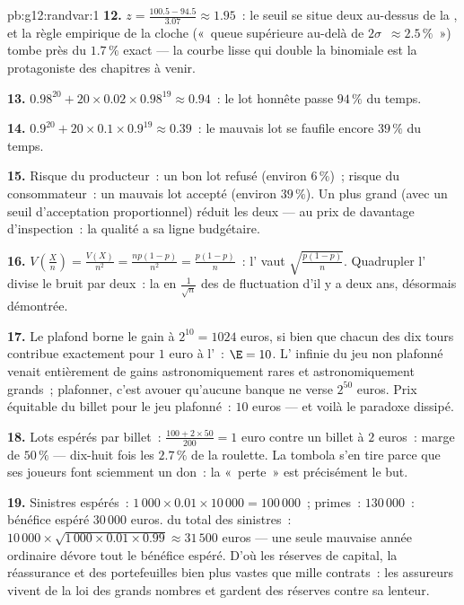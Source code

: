 \begin{solution}{pb:g12:randvar:1}
\textbf{12.} $z = \frac{100.5 - 94.5}{3.07} \approx 1.95$~: le
seuil se situe deux  au-dessus de la , et la
règle empirique de la cloche («~queue supérieure au-delà de
$2\sigma$~$\approx 2.5\,\%$~») tombe près du $1.7\,\%$ exact ---
la courbe lisse qui double la binomiale est la protagoniste des
chapitres à venir.

\textbf{13.} $0.98^{20} + 20 \times 0.02 \times 0.98^{19}
\approx 0.94$~: le lot honnête passe $94\,\%$ du temps.

\textbf{14.} $0.9^{20} + 20 \times 0.1 \times 0.9^{19}
\approx 0.39$~: le mauvais lot se faufile encore $39\,\%$ du
temps.

\textbf{15.} Risque du producteur~: un bon lot refusé (environ
$6\,\%$)~; risque du consommateur~: un mauvais lot accepté (environ
$39\,\%$). Un  plus grand (avec un seuil d'acceptation
proportionnel) réduit les deux --- au prix de davantage
d'inspection~: la qualité a sa ligne budgétaire.

\textbf{16.} $V\!\left(\frac Xn\right) = \frac{V(X)}{n^2} =
\frac{np(1-p)}{n^2} = \frac{p(1-p)}{n}$~: l' vaut
$\sqrt{\frac{p(1-p)}{n}}$. Quadrupler l' divise le bruit
par deux~: la  en $\frac{1}{\sqrt n}$ des  de
fluctuation d'il y a deux ans, désormais démontrée.

\textbf{17.} Le plafond borne le gain à $2^{10} = 1024$ euros, si
bien que chacun des dix tours contribue exactement pour $1$ euro à
l'~: $\E = 10$. L' infinie du jeu non plafonné
venait entièrement de gains astronomiquement rares et
astronomiquement grands~; plafonner, c'est avouer qu'aucune banque
ne verse $2^{50}$ euros. Prix équitable du billet pour le jeu
plafonné~: $10$ euros --- et voilà le paradoxe dissipé.

\textbf{18.} Lots espérés par billet~:
$\frac{100 + 2 \times 50}{200} = 1$ euro contre un billet à $2$
euros~: marge de $50\,\%$ --- dix-huit fois les $2.7\,\%$ de la
roulette. La tombola s'en tire parce que ses joueurs font sciemment
un don~: la «~perte~» est précisément le but.

\textbf{19.} Sinistres espérés~: $1\,000 \times 0.01 \times
10\,000 = 100\,000$~; primes~: $130\,000$~: bénéfice espéré
$30\,000$ euros.  du total des sinistres~:
$10\,000 \times \sqrt{1\,000 \times 0.01 \times 0.99}
\approx 31\,500$ euros --- une seule mauvaise année ordinaire
dévore tout le bénéfice espéré. D'où les réserves de capital, la
réassurance et des portefeuilles bien plus vastes que mille
contrats~: les assureurs vivent de la loi des grands nombres et
gardent des réserves contre sa lenteur.


\end{solution}
